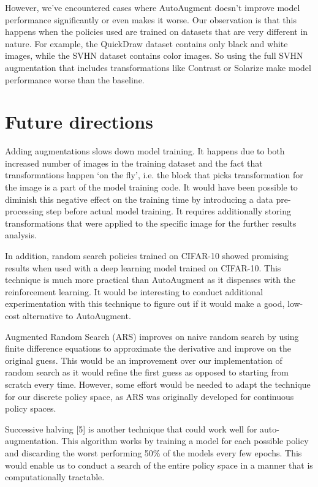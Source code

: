 \documentclass[10pt,twocolumn,letterpaper]{article}
\begin{document}
However, we’ve encountered cases where AutoAugment doesn’t improve model performance significantly or even makes it worse. Our observation is that this happens when the policies used are trained on datasets that are very different in nature. For example, the QuickDraw dataset contains only black and white images, while the SVHN dataset contains color images. So using the full SVHN augmentation that includes transformations like Contrast or Solarize make model performance worse than the baseline. 

\section{Future directions}
Adding augmentations slows down model training. It happens due to both increased number of images in the training dataset and the fact that transformations happen ‘on the fly’, i.e. the block that picks transformation for the image is a part of the model training code. It would have been possible to diminish this negative effect on the training time by introducing a data pre-processing step before actual model training. It requires additionally storing transformations that were applied to the specific image for the further results analysis.

In addition, random search policies trained on CIFAR-10 showed promising results when used with a deep learning model trained on CIFAR-10. This technique is much more practical than AutoAugment as it dispenses with the reinforcement learning. It would be interesting to conduct additional experimentation with this technique to figure out if it would make a good, low-cost alternative to AutoAugment. 

Augmented Random Search (ARS) improves on naive random search by using finite difference equations to approximate the derivative and improve on the original guess. This would be an improvement over our implementation of random search as it would refine the first guess as opposed to starting from scratch every time. However, some effort would be needed to adapt the technique for our discrete policy space, as ARS was originally developed for continuous policy spaces.

Successive halving [5] is another technique that could work well for auto-augmentation. This algorithm works by training a model for each possible policy and discarding the worst performing 50\% of the models every few epochs. This would enable us to conduct a search of the entire policy space in a manner that is computationally tractable.
\end{document}
